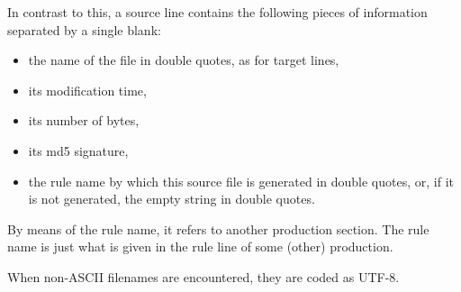 \documentclass[a4paper]{article}%
\begin{document}
In contrast to this, a source line contains the following pieces of information 
separated by a single blank: 
%
\begin{itemize}
  \item the name of the file in double quotes, as for target lines, 
  \item its modification time, 
  \item its number of bytes, 
  \item its md5 signature, 
  \item the rule name by which this source file is generated in double quotes, 
  or, if it is not generated, the empty string in double quotes. 
\end{itemize}

By means of the rule name, it refers to another production section. 
The rule name is just what is given in the rule line of some (other) production. 


When non-ASCII filenames are encountered, they are coded as UTF-8.



{}%
\end{document}
